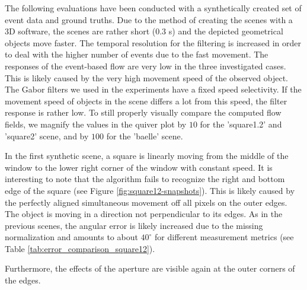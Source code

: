 The following evaluations have been conducted with a synthetically created set of event data and ground truths.
Due to the method of creating the scenes with a 3D software, the scenes are rather short ($0.3$ s) and the depicted geometrical objects move faster.
The temporal resolution for the filtering is increased in order to deal with the higher number of events due to the fast movement.
The responses of the event-based flow are very low in the three investigated cases. 
This is likely caused by the very high movement speed of the observed object.
The Gabor filters we used in the experiments have a fixed speed selectivity. 
If the movement speed of objects in the scene differs a lot from this speed, the filter response is rather low.
To still properly visually compare the computed flow fields, we magnify the values in the quiver plot by $10$ for the 'square1.2' and 'square2' scene, and by $100$ for the 'baelle' scene.


In the first synthetic scene, a square is linearly moving from the middle of the window to the lower right corner of the window with constant speed.
It is interesting to note that the algorithm fails to recognize the right and bottom edge of the square (see Figure \ref{fig:square12-snapshots}).
This is likely caused by the perfectly aligned simultaneous movement off all pixels on the outer edges.
The object is moving in a direction not perpendicular to its edges.
As in the previous scenes, the angular error is likely increased due to the missing normalization and amounts to about $40^\circ$ for different measurement metrics (see Table \ref{tab:error_comparison_square12}). 
 
Furthermore, the effects of the aperture are visible again at the outer corners of the edges.

